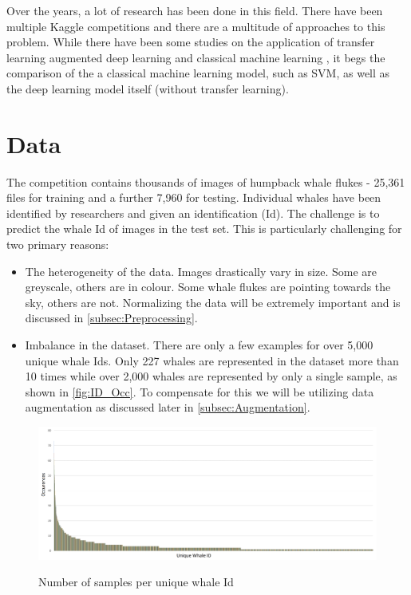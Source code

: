 \documentclass[paper=a4, fontsize=11pt]{scrartcl}
\numberwithin{equation}{section}		%
\numberwithin{table}{section}				%
\begin{document}
Over the years, a lot of research has been done in this field. There have been multiple Kaggle competitions and there are a multitude of approaches to this problem. While there have been some studies on the application of transfer learning augmented deep learning and classical machine learning \cite{YuanHongchun2020AAIC}, it begs the comparison of the a classical machine learning model, such as SVM, as well as the deep learning model itself (without transfer learning). 

\section{Data}\label{sec: data}

The competition contains thousands of images of humpback whale flukes - 25,361 files for training and a further 7,960 for testing. Individual whales have been identified by researchers and given an identification (Id). The challenge is to predict the whale Id of images in the test set. This is particularly challenging for two primary reasons:
\begin{itemize}
  \item The heterogeneity of the data. Images drastically vary in size. Some are greyscale, others are in colour. Some whale flukes are pointing towards the sky, others are not. Normalizing the data will be extremely important and is discussed in \autoref{subsec:Preprocessing}.
  \item Imbalance in the dataset. There are only a few examples for over 5,000 unique whale Ids. Only 227 whales are represented in the dataset more than 10 times while over 2,000 whales are represented by only a single sample, as shown in \autoref{fig:ID_Occ}.  To compensate for this we will be utilizing data augmentation as discussed later in \autoref{subsec:Augmentation}.
\end{itemize}

\begin{figure}[H]
    \caption{Number of samples per unique whale Id}
    \centering
    \includegraphics[width=\textwidth]{ID_Occurences.png}
    \label{fig:ID_Occ}
\end{figure}
\end{document}
